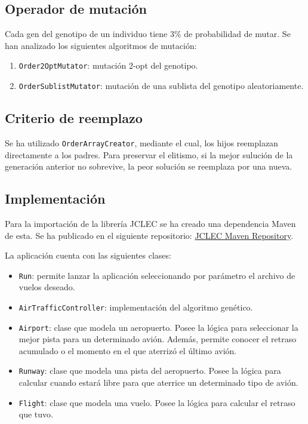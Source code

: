 \documentclass[a4paper,12pt,titlepage]{article}
\begin{document}
\subsection{Operador de mutación}

Cada gen del genotipo de un individuo tiene 3\% de probabilidad de mutar. Se han analizado los siguientes algoritmos de mutación:

\begin{enumerate}[noitemsep]
	\item \lstinline|Order2OptMutator|: mutación 2-opt del genotipo.
	\item \lstinline|OrderSublistMutator|: mutación de una sublista del genotipo aleatoriamente.
\end{enumerate}

\subsection{Criterio de reemplazo}

Se ha utilizado \lstinline|OrderArrayCreator|, mediante el cual, los hijos reemplazan directamente a los padres. Para preservar el elitismo, si la mejor sulución de la generación anterior no sobrevive, la peor solución se reemplaza por una nueva.

\subsection{Implementación}

Para la importación de la librería JCLEC se ha creado una dependencia Maven de esta. Se ha publicado en el siguiente repositorio: \href{https://github.com/davidmigloz/jclec\_maven\_repo}{JCLEC Maven Repository}.

La aplicación cuenta con las siguientes clases:

\begin{itemize}[noitemsep]
	\item \lstinline|Run|: permite lanzar la aplicación seleccionando por parámetro el archivo de vuelos deseado.
	\item \lstinline|AirTrafficController|: implementación del algoritmo genético.
	\item \lstinline|Airport|: clase que modela un aeropuerto. Posee la lógica para seleccionar la mejor pista para un determinado avión. Además, permite conocer el retraso acumulado o el momento en el que aterrizó el último avión.
	\item \lstinline|Runway|: clase que modela una pista del aeropuerto. Posee la lógica para calcular cuando estará libre para que aterrice un determinado tipo de avión.
	\item \lstinline|Flight|: clase que modela una vuelo. Posee la lógica para calcular el retraso que tuvo.
\end{itemize}
\end{document}
